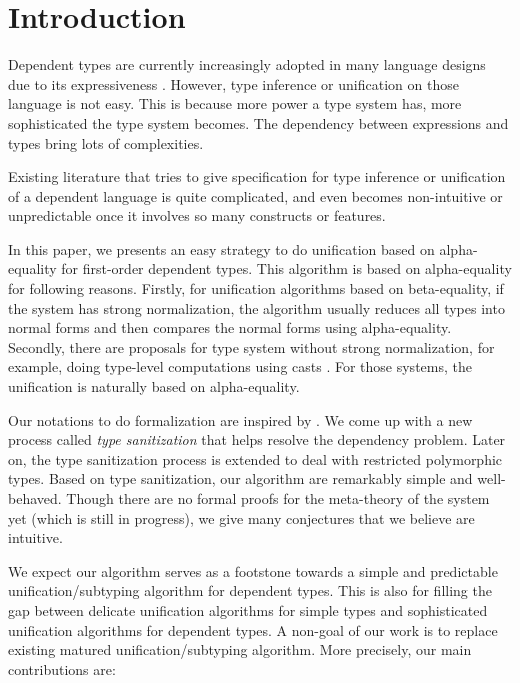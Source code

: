 \section{Introduction}

Dependent types are currently increasingly adopted in many language
designs due to its expressiveness \cite{xi1999dependent, licata2005formulation,
  pasalic2006concoqtion, mckinna2006dependent,
  norell2009dependently, brady2013idris}.
However, type inference or unification on those language is not easy.
This is because
more power a type system has, more sophisticated the type system
becomes. The dependency between expressions and types bring lots of complexities.

Existing literature \cite{ziliani2015unification, abel2011higher, elliott1989higher}
that tries to give specification for type inference
or unification of
a dependent language is quite complicated,
and even becomes non-intuitive or unpredictable once it involves
so many constructs or features.

In this paper, we presents an easy strategy to do unification based on
alpha-equality for first-order dependent
types. This algorithm is based on alpha-equality for following reasons. Firstly,
for unification algorithms based on beta-equality, if the system has strong
normalization, the algorithm usually reduces all types into normal forms and
then compares the normal forms using
alpha-equality.
Secondly, there are proposals for type system without strong
normalization, for example, doing type-level computations using casts
\cite{van2013explicit, kimmell2012equational, sjoberg2012irrelevance}
. For
those systems, the unification is naturally based on alpha-equality.

Our notations to do formalization are inspired by \cite{dunfield2013complete}.
We come up with a new
process called \textit{type sanitization} that helps resolve the dependency
problem. Later on, the type sanitization process is
extended to deal with restricted polymorphic types.
Based on type sanitization, our algorithm
are remarkably simple and well-behaved.
Though there are no formal proofs for the meta-theory of the system yet
(which is still in progress),
we give many conjectures that we believe are intuitive.

We expect our algorithm serves as a footstone towards
a simple and predictable unification/subtyping algorithm for
dependent types. This is also for
filling the gap between
delicate unification algorithms for simple types
and
sophisticated unification algorithms for dependent types.
A non-goal of our work
is to replace existing matured unification/subtyping algorithm.
More precisely, our main contributions are:

